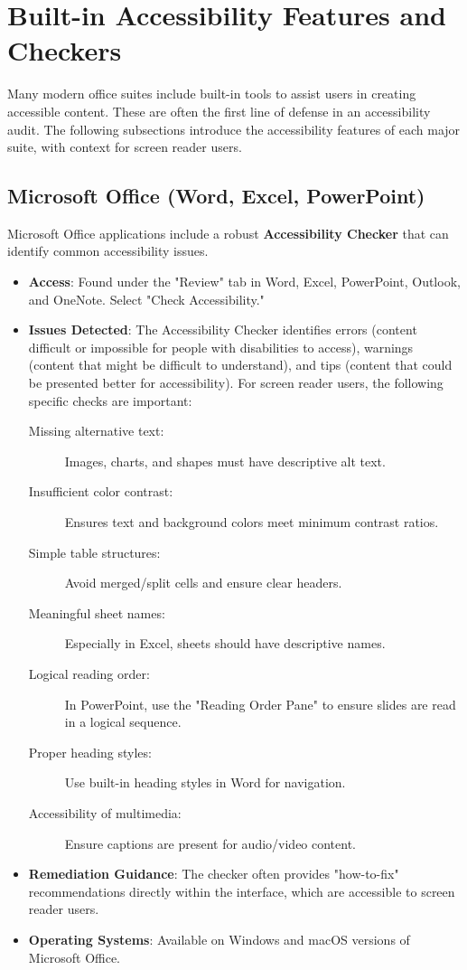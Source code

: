 \section{Built-in Accessibility Features and Checkers}
\label{sec:office-built-in-checkers}

Many modern office suites include built-in tools to assist users in creating accessible content. These are often the first line of defense in an accessibility audit. The following subsections introduce the accessibility features of each major suite, with context for screen reader users.

\subsection{Microsoft Office (Word, Excel, PowerPoint)}
\label{subsec:msoffice-accessibility}
Microsoft Office applications include a robust \textbf{Accessibility Checker} \cite{MSAccessibilityChecker} that can identify common accessibility issues.
\begin{itemize}
    \item \textbf{Access}: Found under the "Review" tab in Word, Excel, PowerPoint, Outlook, and OneNote. Select "Check Accessibility."
    \item \textbf{Issues Detected}: The Accessibility Checker identifies errors (content difficult or impossible for people with disabilities to access), warnings (content that might be difficult to understand), and tips (content that could be presented better for accessibility). For screen reader users, the following specific checks are important:
    \begin{description}
        \item[Missing alternative text:] Images, charts, and shapes must have descriptive alt text.
        \item[Insufficient color contrast:] Ensures text and background colors meet minimum contrast ratios.
        \item[Simple table structures:] Avoid merged/split cells and ensure clear headers.
        \item[Meaningful sheet names:] Especially in Excel, sheets should have descriptive names.
        \item[Logical reading order:] In PowerPoint, use the "Reading Order Pane" to ensure slides are read in a logical sequence.
        \item[Proper heading styles:] Use built-in heading styles in Word for navigation.
        \item[Accessibility of multimedia:] Ensure captions are present for audio/video content.
    \end{description}
    \item \textbf{Remediation Guidance}: The checker often provides "how-to-fix" recommendations directly within the interface, which are accessible to screen reader users.
    \item \textbf{Operating Systems}: Available on Windows and macOS versions of Microsoft Office.
\end{itemize}

